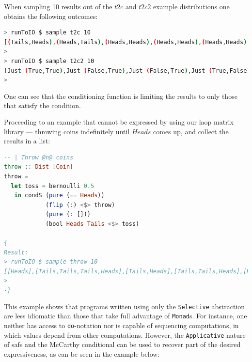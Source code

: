 \documentclass[
  oneside,
  11pt, a4paper,
  footinclude=true,
  headinclude=true,
  cleardoublepage=empty
]{scrbook}
\theoremstyle{definition}
\theoremstyle{definition}
\begin{document}
    When sampling 10 results out of the $t2c$ and $t2c2$ example distributions one obtains the following outcomes:
    
    \begin{lstlisting}[language=Bash, caption={Coin toss results},captionpos=b]
> runToIO $ sample t2c 10
[(Tails,Heads),(Heads,Tails),(Heads,Heads),(Heads,Heads),(Heads,Heads),(Tails,Heads),(Heads,Tails),(Tails,Heads),(Heads,Heads),(Heads,Heads)] 
>
> runToIO $ sample t2c2 10
[Just (True,True),Just (False,True),Just (False,True),Just (True,False),Nothing,Just (True,False),Nothing,Nothing,Just (False,True),Just (True,True)]
>
    \end{lstlisting}
    
    \noindent One can see that the conditioning function is limiting the results to only those that satisfy the condition.

    Proceeding to an example that cannot be expressed by using our \gls{laop} matrix library --- throwing coins indefinitely until $Heads$ comes up, and collect the results in a list:
    
    \begin{lstlisting}[language=Haskell, caption={Throw coins indefinitely until Heads comes up},captionpos=b]
-- | Throw @n@ coins
throw :: Dist [Coin]
throw =
  let toss = bernoulli 0.5
   in condS (pure (== Heads))
            (flip (:) <$> throw)
            (pure (: []))
            (bool Heads Tails <$> toss)

{-
Result:
> runToIO $ sample throw 10
[[Heads],[Tails,Tails,Tails,Heads],[Tails,Heads],[Tails,Tails,Heads],[Heads],[Heads],[Tails,Heads],[Tails,Heads],[Heads],[Tails,Heads]]
>
-}
    \end{lstlisting}
    
    This example shows that programs written using only the \texttt{Selective} abstraction are less idiomatic than those that take full advantage of \texttt{Monad}s. For instance, one neither has access to \texttt{do}-notation nor is capable of sequencing computations, in which values depend from other computations. However, the \texttt{Applicative} nature of \glspl{saf} and the McCarthy conditional can be used to recover part of the desired expressiveness, as can be seen in the example below:
    
\end{document}
